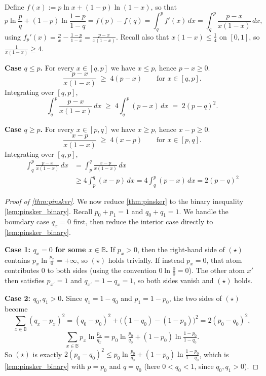 \documentclass[fontsize=11pt, parskip=half]{scrartcl}
\begin{document}
    Define $f(x) := p \ln x + (1-p) \ln (1-x)$, so that
    \[
    p \ln \frac{p}{q} + (1-p) \ln \frac{1-p}{1-q} = f(p) - f(q)
    = \int_q^p f'(x)\, dx
    = \int_q^p \frac{p-x}{x(1-x)}\, dx,
    \]
    using $f_p'(x) = \frac{p}{x} - \frac{1-p}{1-x} = \frac{p-x}{x(1-x)}$. Recall also that $x(1-x) \leq \tfrac14$ on $[0,1]$, so $\frac{1}{x(1-x)} \geq 4$.
    
    \textbf{Case $q \leq p$.} For every $x \in [q,p]$ we have $x \leq p$, hence $p - x \geq 0$.
    \[
    \frac{p-x}{x(1-x)} \;\geq\; 4(p-x) \qquad \text{for } x \in [q,p].
    \]
    Integrating over $[q,p]$,
    \[
    \int_q^p \frac{p-x}{x(1-x)}\, dx \;\geq\; 4 \int_q^p (p-x)\, dx \;=\; 2(p-q)^2.
    \]
    
    \textbf{Case $q \geq p$.} For every $x \in [p,q]$ we have $x \geq p$, hence $x - p \geq 0$. 
    \[
    \frac{x-p}{x(1-x)} \;\geq\; 4(x-p) \qquad \text{for } x \in [p,q].
    \]
    Integrating over $[q,p]$,
    \begin{align*}
    \int_q^p \frac{p-x}{x(1-x)}\, dx
    &= \int_p^q \frac{x-p}{x(1-x)}\, dx \\
    &\geq 4 \int_p^q (x-p)\, dx
    = 4 \int_q^p (p-x)\, dx
    = 2(p-q)^2
    \end{align*}

\begin{proof}[Proof of \cref{thm:pinsker}]
    We now reduce \cref{thm:pinsker} to the binary inequality \cref{lem:pinsker_binary}.
    Recall $p_0 + p_1 = 1$ and $q_0 + q_1 = 1$. We handle the boundary case
$q_x = 0$ first, then reduce the interior case directly to
\cref{lem:pinsker_binary}.

\medskip
\textbf{Case 1: $q_x = 0$ for some $x \in \mathbb{B}$.}
If $p_x > 0$, then the right-hand side of $(\star)$ contains
$p_x \ln \tfrac{p_x}{0} = +\infty$, so $(\star)$ holds trivially.
If instead $p_x = 0$, that atom contributes $0$ to both sides
(using the convention $0 \ln \tfrac{0}{0} = 0$). The other atom $x'$ then
satisfies $p_{x'} = 1$ and $q_{x'} = 1 - q_x = 1$, so both sides vanish and
$(\star)$ holds.

\medskip
\textbf{Case 2: $q_0, q_1 > 0$.}
Since $q_1 = 1 - q_0$ and $p_1 = 1 - p_0$, the two sides of $(\star)$ become
\[
    \sum_{x \in \mathbb{B}} (q_x - p_x)^2
    = (q_0 - p_0)^2 + \big((1-q_0) - (1-p_0)\big)^2
    = 2(p_0 - q_0)^2,
\]
\[
    \sum_{x \in \mathbb{B}} p_x \ln \tfrac{p_x}{q_x}
    = p_0 \ln \tfrac{p_0}{q_0} + (1 - p_0) \ln \tfrac{1 - p_0}{1 - q_0}.
\]
So $(\star)$ is exactly
$2(p_0 - q_0)^2 \leq p_0 \ln \tfrac{p_0}{q_0} + (1 - p_0) \ln \tfrac{1 - p_0}{1 - q_0}$,
which is \cref{lem:pinsker_binary} with $p = p_0$ and $q = q_0$
(here $0 < q_0 < 1$, since $q_0, q_1 > 0$).
\end{proof}
\end{document}
